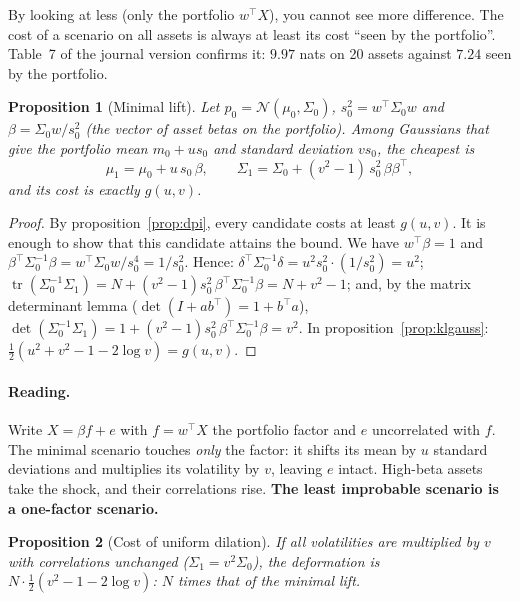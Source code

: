 \documentclass[11pt]{article}
\theoremstyle{plain}
\newtheorem{proposition}{Proposition}[section]
\theoremstyle{definition}
\theoremstyle{remark}
\newcommand{\N}{\mathcal{N}}
\newcommand{\tr}{\operatorname{tr}}
\begin{document}
\begin{intuition}
By looking at less (only the portfolio $w^\top X$), you cannot see more
difference. The cost of a scenario on all assets is always at least its cost
``seen by the portfolio''. Table~7 of the journal version confirms it: $9.97$ nats on 20
assets against $7.24$ seen by the portfolio.
\end{intuition}

\begin{proposition}[Minimal lift]
\label{prop:lift}
Let $p_0=\N(\mu_0,\Sigma_0)$, $s_0^2=w^\top\Sigma_0w$ and
$\beta=\Sigma_0w/s_0^2$ (the vector of asset betas on the portfolio). Among
Gaussians that give the portfolio mean $m_0+us_0$ and standard deviation
$vs_0$, the cheapest is
\[
\mu_1=\mu_0+u\,s_0\,\beta,\qquad\Sigma_1=\Sigma_0+(v^2-1)\,s_0^2\,\beta\beta^\top,
\]
and its cost is exactly $g(u,v)$.
\end{proposition}

\begin{proof}
By proposition~\ref{prop:dpi}, every candidate costs at least $g(u,v)$. It is
enough to show that this candidate attains the bound. We have $w^\top\beta=1$
and $\beta^\top\Sigma_0^{-1}\beta=w^\top\Sigma_0w/s_0^4=1/s_0^2$. Hence:
$\delta^\top\Sigma_0^{-1}\delta=u^2s_0^2\cdot(1/s_0^2)=u^2$;
$\tr(\Sigma_0^{-1}\Sigma_1)=N+(v^2-1)s_0^2\,\beta^\top\Sigma_0^{-1}\beta=N+v^2-1$;
and, by the matrix determinant lemma ($\det(I+ab^\top)=1+b^\top a$),
$\det(\Sigma_0^{-1}\Sigma_1)=1+(v^2-1)s_0^2\,\beta^\top\Sigma_0^{-1}\beta=v^2$.
In proposition~\ref{prop:klgauss}: $\tfrac12(u^2+v^2-1-2\log v)=g(u,v)$.
\end{proof}

\paragraph{Reading.} Write $X=\beta f+e$ with $f=w^\top X$ the portfolio
factor and $e$ uncorrelated with $f$. The minimal scenario touches \emph{only}
the factor: it shifts its mean by $u$ standard deviations and multiplies its
volatility by $v$, leaving $e$ intact. High-beta assets take the shock, and
their correlations rise. \textbf{The least improbable scenario is a
one-factor scenario.}

\begin{proposition}[Cost of uniform dilation]
\label{prop:uniforme}
If all volatilities are multiplied by $v$ with correlations unchanged
($\Sigma_1=v^2\Sigma_0$), the deformation is $N\cdot\tfrac12(v^2-1-2\log v)$:
$N$ times that of the minimal lift.
\end{proposition}
\end{document}
